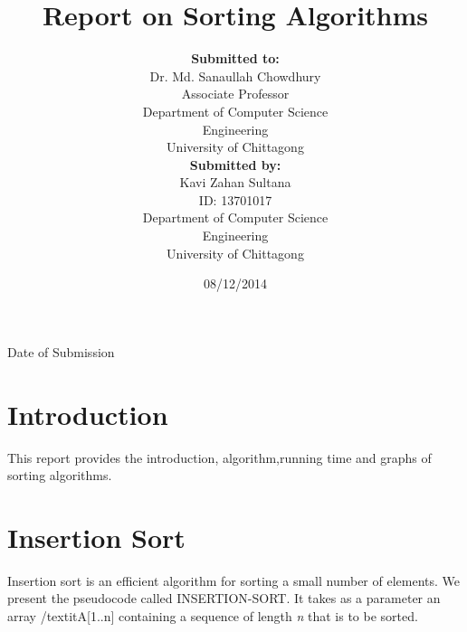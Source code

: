 \documentclass[9 pt]{report}
\begin{document}
\title{\sffamily\huge\textbf{Report on Sorting Algorithms}}

\maketitle

\author{\huge\textbf{Submitted to:}

              \huge Dr. Md. Sanaullah Chowdhury

                Associate Professor
 
                \huge Department of Computer Science

                 \huge Engineering
                
                  \huge University of Chittagong 
                   
\vspace{1cm}

                    \huge\textbf{Submitted by:}

                     \huge Kavi Zahan Sultana

                     ID: 13701017

                     \huge Department of Computer Science 

                     \huge Engineering

                      \huge University of Chittagong
                     }

\huge Date of Submission

\date{08/12/2014}

\newpage

\tableofcontents

\newpage

\section{\huge Introduction}

This report provides the introduction, algorithm,running time and graphs of sorting algorithms.

\section{\huge Insertion Sort}

Insertion sort is an efficient algorithm for sorting a small number of elements. We present the pseudocode called INSERTION-SORT.
It takes as a parameter an array /textit{A[1..n]}  containing a sequence of length \textit{n} that is to be sorted.
\end{document}
